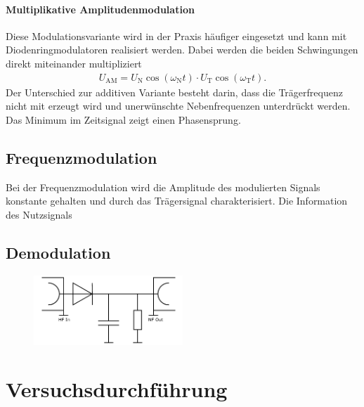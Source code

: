 \documentclass[a4paper,twoside,final]{article}
\begin{document}
\paragraph{Multiplikative Amplitudenmodulation}
Diese Modulationsvariante wird in der Praxis häufiger eingesetzt und kann mit Diodenringmodulatoren realisiert werden. Dabei werden die beiden Schwingungen direkt miteinander multipliziert
\begin{align}
    U_\text{AM} = U_\text{N} \cos(\omega_\text{N}t)\cdot U_\text{T} \cos(\omega_\text{T}t).
\end{align}
Der Unterschied zur additiven Variante besteht darin, dass die Trägerfrequenz nicht mit erzeugt wird und unerwünschte Nebenfrequenzen unterdrückt werden. Das Minimum im Zeitsignal zeigt einen Phasensprung.

\subsection{Frequenzmodulation}
Bei der Frequenzmodulation wird die Amplitude des modulierten Signals konstante gehalten und durch das Trägersignal charakterisiert. Die Information des Nutzsignals


\subsection{Demodulation}
\begin{figure}[htp]
    \centering
    \includegraphics[width=0.5\textwidth]{Schaltungen/Demodulator.pdf}
    \caption{}
    \label{fig:Demodulator}
\end{figure}
\section{Versuchsdurchführung} \label{sec:Versuchsdurchführung}
\end{document}

